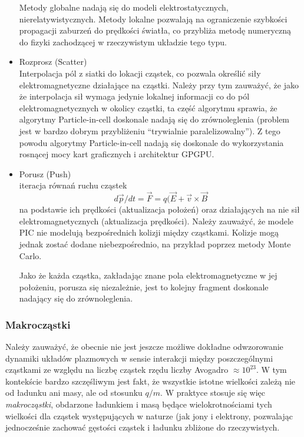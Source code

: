 \begin{itemize}
    Metody globalne nadają się do modeli elektrostatycznych,
    nierelatywistycznych.  Metody lokalne pozwalają na ograniczenie szybkości
    propagacji zaburzeń do prędkości światła, co przybliża metodę numeryczną do
    fizyki zachodzącej w rzeczywistym układzie tego typu.
    \item Rozprosz (Scatter) \\
    Interpolacja pól z siatki do lokacji cząstek, co pozwala określić siły
    elektromagnetyczne działające na cząstki.  Należy przy tym zauważyć, że
    jako że interpolacja sił wymaga jedynie lokalnej informacji co do pól
    elektromagnetycznych w okolicy cząstki, ta część algorytmu sprawia, że
    algorytmy Particle-in-cell doskonale nadają się do zrównoleglenia (problem
    jest w bardzo dobrym przybliżeniu ``trywialnie paralelizowalny''). Z tego
    powodu algorytmy Particle-in-cell nadają się doskonale do wykorzystania
    rosnącej mocy kart graficznych i architektur GPGPU.
    \item Porusz (Push) \\
    iteracja równań ruchu cząstek
    \begin{equation}
        d \vec{p}/dt = \vec{F} = q (\vec{E} + \vec{v} \times \vec{B}
        \label{eq-of-motion}
    \end{equation}
    na podstawie ich prędkości (aktualizacja położeń) oraz działających na nie
    sił elektromagnetycznych (aktualizacja prędkości). Należy zauważyć, że
    modele PIC nie modelują bezpośrednich kolizji między cząstkami. Kolizje
    mogą jednak zostać dodane niebezpośrednio, na przykład poprzez metody Monte
    Carlo. %

    Jako że każda cząstka, zakładając znane pola elektromagnetyczne w jej
    położeniu, porusza się niezależnie, jest to kolejny fragment doskonale
    nadający się do zrównoleglenia.
    \end{itemize}
    \subsubsection{Makrocząstki}
    Należy zauważyć, że obecnie nie jest jeszcze możliwe dokładne odwzorowanie
    dynamiki układów plazmowych w sensie interakcji między poszczególnymi
    cząstkami ze względu na liczbę cząstek rzędu liczby Avogadro $\approx
    10^{23}$.  W tym kontekście bardzo szczęśliwym jest fakt, że wszystkie
    istotne wielkości zależą nie od ładunku ani masy, ale od stosunku $q/m$. W
    praktyce stosuje się więc \emph{makrocząstki}, obdarzone ładunkiem i masą
    będące wielokrotnościami tych wielkości dla cząstek występujących w naturze
    (jak jony i elektrony, pozwalając jednocześnie zachować gęstości cząstek i
    ładunku zbliżone do rzeczywistych.

